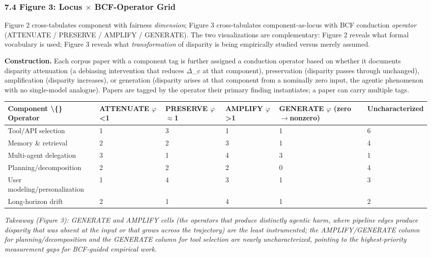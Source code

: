 \documentclass[10pt]{article}
\begin{document}
\subsubsection*{7.4 Figure 3: Locus $\times$ BCF-Operator Grid}

Figure 2 cross-tabulates component with fairness \emph{dimension}; Figure 3 cross-tabulates component-as-locus with BCF conduction \emph{operator} (ATTENUATE / PRESERVE / AMPLIFY / GENERATE). The two visualizations are complementary: Figure 2 reveals what formal vocabulary is used; Figure 3 reveals what \emph{transformation} of disparity is being empirically studied versus merely assumed.

\textbf{Construction.} Each corpus paper with a component tag is further assigned a conduction operator based on whether it documents disparity attenuation (a debiasing intervention that reduces $\Delta$\_c at that component), preservation (disparity passes through unchanged), amplification (disparity increases), or generation (disparity arises at that component from a nominally zero input, the agentic phenomenon with no single-model analogue). Papers are tagged by the operator their primary finding instantiates; a paper can carry multiple tags.

\begin{center}\footnotesize
\begin{longtable}{|p{}|p{}|p{}|p{}|p{}|p{}|}
\hline \textbf{Component \textbackslash\{\} Operator} & \textbf{ATTENUATE $\varphi$<1} & \textbf{PRESERVE $\varphi$$\approx$1} & \textbf{AMPLIFY $\varphi$>1} & \textbf{GENERATE $\varphi$ (zero$\rightarrow$nonzero)} & \textbf{Uncharacterized} \\ \hline\endhead
Tool/API selection & 1 & 3 & 1 & 1 & 6 \\ \hline
Memory \& retrieval & 2 & 2 & 3 & 1 & 4 \\ \hline
Multi-agent delegation & 3 & 1 & 4 & 3 & 1 \\ \hline
Planning/decomposition & 2 & 2 & 2 & 0 & 4 \\ \hline
User modeling/personalization & 1 & 4 & 3 & 1 & 3 \\ \hline
Long-horizon drift & 2 & 1 & 4 & 1 & 2 \\ \hline
\end{longtable}\end{center}

\emph{Takeaway (Figure 3): GENERATE and AMPLIFY cells (the operators that produce distinctly agentic harm, where pipeline edges produce disparity that was absent at the input or that grows across the trajectory) are the least instrumented; the AMPLIFY/GENERATE column for planning/decomposition and the GENERATE column for tool selection are nearly uncharacterized, pointing to the highest-priority measurement gaps for BCF-guided empirical work.}
\end{document}

